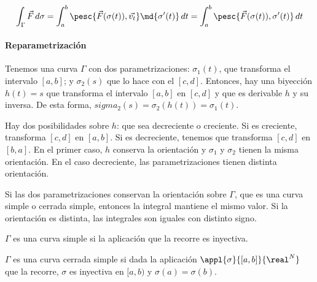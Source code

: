 \documentclass[12pt,a4paper,titlepage]{apuntes}
\begin{document}
\[ \int_\Gamma \vec{F} \,d\sigma = \int_a^b \pesc{\vec{F}(\sigma(t)), \vec{v_t}} \md{\sigma'(t)}\,dt = \int_a^b \pesc{\vec{F}(\sigma(t)), \sigma'(t)} \,dt \]

\paragraph{Reparametrización}

Tenemos una curva $\Gamma$ con dos parametrizaciones: $\sigma_1(t)$, que transforma el intervalo $[a,b]$; y $\sigma_2(s)$ que lo hace con el $[c,d]$. Entonces, hay una biyección $h(t) = s$ que transforma el intervalo $[a,b]$ en $[c,d]$ y que es derivable $h$ y su inversa. De esta forma, $sigma_2(s) = \sigma_2(h(t)) = \sigma_1(t)$.

Hay dos posibilidades sobre $h$: que sea decreciente o creciente. Si es creciente, transforma $[c,d]$ en $[a,b]$. Si es decreciente, tenemos que transforma $[c,d]$ en $[b,a]$. En el primer caso, $h$ conserva la orientación y $\sigma_1$ y $\sigma_2$ tienen la misma orientación. En el caso decreciente, las parametrizaciones tienen distinta orientación.

\begin{theorem}
Si las dos parametrizaciones conservan la orientación sobre $\Gamma$, que es una curva simple o cerrada simple, entonces la integral mantiene el mismo valor. Si la orientación es distinta, las integrales son iguales con distinto signo.
\end{theorem}

\begin{defn}
$\Gamma$ es una curva simple si la aplicación que la recorre es inyectiva.
\end{defn}

\begin{defn}
$\Gamma$ es una curva cerrada simple si dada la aplicación $\appl{\sigma}{[a,b]}{\real^N}$ que la recorre, $\sigma$ es inyectiva en $[a,b)$ y $\sigma(a) = \sigma(b)$.
\end{defn}
\end{document}
